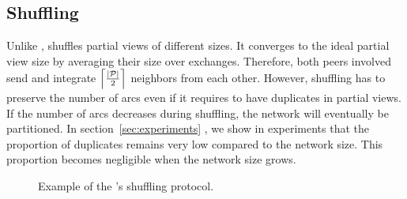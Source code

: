 \subsection{Shuffling}
\label{subsec:cyclic}





Unlike \CYCLON{}, \SPRAY{} shuffles partial views of different
sizes. It converges to the ideal partial view size by averaging their
size over exchanges. Therefore, both peers involved send and integrate
$\left\lceil|\mathcal{P}|\over{2}\right\rceil$ neighbors from each
other. However, shuffling has to preserve the number of arcs even if
it requires to have duplicates in partial views. If the number of arcs
decreases during shuffling, the network will eventually be
partitioned. In section~\ref{sec:experiments} , we show in experiments
that the proportion of duplicates remains very low compared to
the network size. This proportion becomes negligible when the network
size grows. 

\begin{figure*}
  \centering
  \hspace{10pt}
  \hspace{10pt}
  \caption{\label{fig:cyclicexample}Example of the \SPRAY{}'s shuffling
    protocol. }
\end{figure*}



